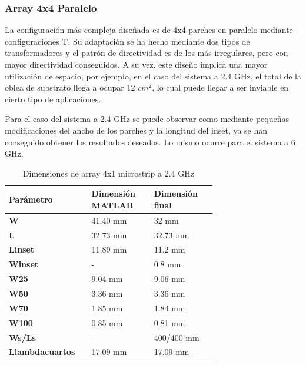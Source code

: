 \subsubsection{Array 4x4 Paralelo} 
\par La configuración más compleja diseñada es de 4x4 parches en paralelo mediante configuraciones T. Su adaptación se ha hecho mediante dos tipos de transformadores y el patrón de directividad es de los más irregulares, pero con mayor directividad conseguidos. A su vez, este diseño implica una mayor utilización de espacio, por ejemplo, en el caso del sistema a 2.4 GHz, el total de la oblea de substrato llega a ocupar 12 $cm^{2}$, lo cual puede llegar a ser inviable en cierto tipo de aplicaciones. 
\\
\par Para el caso del sistema a 2.4 GHz se puede observar como mediante pequeñas modificaciones del ancho de los parches y la longitud del inset, ya se han conseguido obtener los resultados deseados. Lo mismo ocurre para el sistema a 6 GHz.
\\
\begin{table}[H]
  
   \label{tab:array4x11}
   \small %
   \centering %
   \begin{tabular}{m{0.2\linewidth}m{0.25\linewidth}m{0.25\linewidth}} %
   \toprule[\heavyrulewidth]\toprule[\heavyrulewidth]
   \textbf{Parámetro} & \textbf{Dimensión MATLAB} & \textbf{Dimensión final} \\ 
   \midrule
   \textbf{W} & 41.40 mm & 32 mm \\
   \textbf{L} & 32.73 mm & 32.73 mm\\
   \textbf{Linset} & 11.89 mm & 11.2 mm\\
   \textbf{Winset} & - & 0.8 mm\\
   \textbf{W25} & 9.04 mm & 9.06 mm\\
   \textbf{W50} & 3.36 mm & 3.36 mm\\
   \textbf{W70} & 1.85 mm & 1.84 mm\\
   \textbf{W100} & 0.85 mm & 0.81 mm\\
   \textbf{Ws/Ls} & - & 400/400 mm\\
   \textbf{Llambdacuartos} & 17.09 mm & 17.09 mm\\
   \bottomrule[\heavyrulewidth] 
   \end{tabular}
   \caption{Dimensiones de array 4x1 microstrip a 2.4 GHz} 
\end{table}

